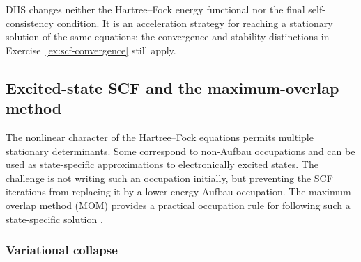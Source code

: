 \documentclass[11pt,a4paper,titlepage]{article}
\numberwithin{equation}{section}
\begin{document}
DIIS changes neither the Hartree--Fock energy functional nor the final
self-consistency condition. It is an acceleration strategy for reaching a
stationary solution of the same equations; the convergence and stability
distinctions in Exercise~\ref{ex:scf-convergence} still apply.

\subsection{Excited-state SCF and the maximum-overlap method}

The nonlinear character of the Hartree--Fock equations permits multiple
stationary determinants. Some correspond to non-Aufbau occupations and can be
used as state-specific approximations to electronically excited states. The
challenge is not writing such an occupation initially, but preventing the SCF
iterations from replacing it by a lower-energy Aufbau occupation.
The maximum-overlap method (MOM) provides a practical occupation rule for following
such a state-specific solution \citep{Gilbert2008}.

\subsubsection{Variational collapse}
\end{document}
